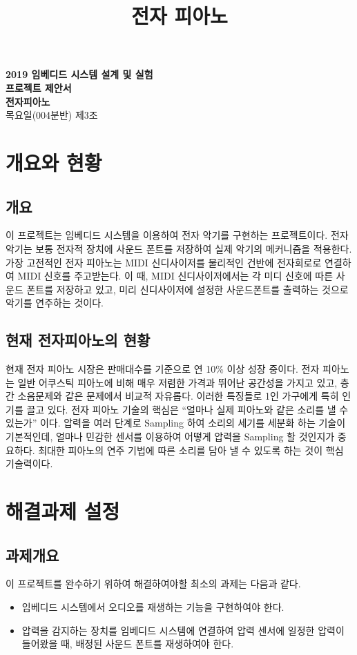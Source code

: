 \documentclass[a4paper, 11pt]{article}
\title{전자 피아노}
\begin{document}
\begin{titlepage}
\vspace{4cm}
\begin{center}
{\huge \textbf{2019 임베디드 시스템 설계 및 실험\\ 프로젝트 제안서}}\\[2cm]
{\Huge \textbf{전자피아노}}\\[2cm]
{\Large 목요일(004분반) 제3조 }\\[3cm]
\tableofcontents
\end{center}
\end{titlepage}

\section{개요와 현황}

\subsection{개요}
  이 프로젝트는 임베디드 시스템을 이용하여 전자 악기를 구현하는 프로젝트이다. 전자악기는 보통 전자적 장치에 사운드 폰트를 저장하여 실제 악기의 메커니즘을 적용한다. 가장 고전적인 전자 피아노는 MIDI 신디사이저를 물리적인 건반에 전자회로로 연결하여 MIDI 신호를 주고받는다. 이 때, MIDI 신디사이저에서는 각 미디 신호에 따른 사운드 폰트를 저장하고 있고, 미리 신디사이저에 설정한 사운드폰트를 출력하는 것으로 악기를 연주하는 것이다.
     
\subsection{현재 전자피아노의 현황}

현재 전자 피아노 시장은 판매대수를 기준으로 연 10\% 이상 성장 중이다. 전자 피아노는 일반 어쿠스틱 피아노에 비해 매우 저렴한 가격과 뛰어난 공간성을 가지고 있고, 층간 소음문제와 같은 문제에서 비교적 자유롭다. 이러한 특징들로 1인 가구에게 특히 인기를 끌고 있다. 
전자 피아노 기술의 핵심은 “얼마나 실제 피아노와 같은 소리를 낼 수 있는가” 이다. 압력을 여러 단계로 Sampling 하여 소리의 세기를 세분화 하는 기술이 기본적인데, 얼마나 민감한 센서를 이용하여 어떻게 압력을 Sampling 할 것인지가 중요하다. 최대한 피아노의 연주 기법에 따른 소리를 담아 낼 수 있도록 하는 것이 핵심 기술력이다. 

\section{해결과제 설정}
\subsection{과제개요}
이 프로젝트를 완수하기 위하여 해결하여야할 최소의 과제는 다음과 같다. 
\begin{itemize}
\item 임베디드 시스템에서 오디오를 재생하는 기능을 구현하여야 한다.
\item 압력을 감지하는 장치를 임베디드 시스템에 연결하여 압력 센서에 일정한 압력이 들어왔을 때, 배정된 사운드 폰트를 재생하여야 한다.
\end{itemize}
\end{document}
